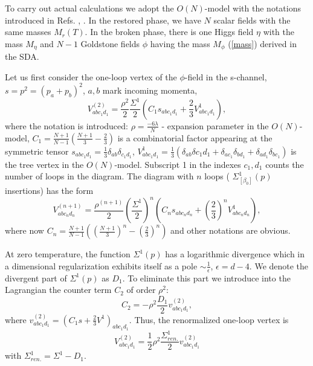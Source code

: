 \documentclass[a4paper,12pt]{article}
\begin{document}
To carry out actual calculations we adopt the $O(N)$-model with the
notations introduced in Refs. \cite{prd}, \cite{pl}. In the restored
phase, we have $N$ scalar fields with the same masses $M_r(T).$ In the
broken phase, there is one Higgs field $\eta$ with the mass $M_{\eta}$
and $N - 1$ Goldstone fields $\phi$ having the mass $M_{\phi}$
(\ref{mass}) derived in the SDA.

Let us first consider the one-loop vertex of the $\phi$-field in the
s-channel, $s = p^2 = (p_a + p_b)^2$, $a, b$ mark incoming momenta,
\begin{equation} \label{v1}
V^{(2)}_{abc_1 d_1} = \frac{\rho^2 }{2}\frac{ \Sigma^1}{2} (C_1
s_{abc_1 d_1} + \frac{2}{3} V^1 _{abc_1 d_1}),
\end{equation}
where the notation is introduced: $\rho = \frac{-6 \lambda}{N}$ -
expansion parameter in the $O(N)$-model, $C_1 = \frac{N+1}{N-1} (
\frac{N+1}{3} - \frac{2}{3})$ is a combinatorial factor appearing at
the symmetric tensor $ s_{abc_1 d_1} = \frac{1}{3}\delta_{ab}
\delta_{c_1 d_1}$, $V^1 _{abc_1 d_1}= \frac{1}{3}(\delta_{ab}
\delta{c_1 d_1} + \delta_{a c_1} \delta_{b d_1} + \delta_{a d_1}
\delta_{b c_1})$ is the tree vertex in the $O(N)$-model. Subscript 1
in the indexes $c_1, d_1$ counts the number of loops in the
diagram. The diagram with $n$ loops ( $\Sigma^1_{[\beta_0]}(p)$
insertions) has the form
\begin{equation} \label{vn}
V^{(n+1)}_{abc_n d_n} = \frac{\rho^{(n+1)} }{2}(\frac{ \Sigma^1}{2})^n
(C_n s_{abc_n d_n} + (\frac{2}{3})^n V^1 _{abc_n d_n}),
\end{equation}
where now $C_n = \frac{N+1}{N-1} ( (\frac{N+1}{3})^n -
(\frac{2}{3})^n)$ and other notations are obvious.

At zero temperature, the function $\Sigma^1(p)$ has a logarithmic
divergence which in a dimensional regularization exhibits itself as a
pole $\sim \frac{1}{\epsilon}$, $\epsilon = d - 4$. We denote the
divergent part of $\Sigma^1(p)$ as $D_1$. To eliminate this part we
introduce into the Lagrangian the counter term $C_2$ of order
$\rho^2$:
\begin{equation} \label{C2}
C_2 = - \rho^2 \frac{D_1}{2} v^{(2)}_{abc_1 d_1},
\end{equation}
where $ v^{(2)}_{abc_1 d_1} = ( C_1 s + \frac{2}{3} V^1 )_{abc_1
d_1}$. Thus, the renormalized one-loop vertex is
\begin{equation} \label{v1r}
V^{(2)}_{abc_1 d_1} = \frac{1}{2} \rho^2 \frac{\Sigma^1_{ren.}}{2}
 v^{(2)}_{abc_1 d_1}
\end{equation}
with $\Sigma^{1}_{ren.} = \Sigma^1 - D_1$. 
\end{document}
